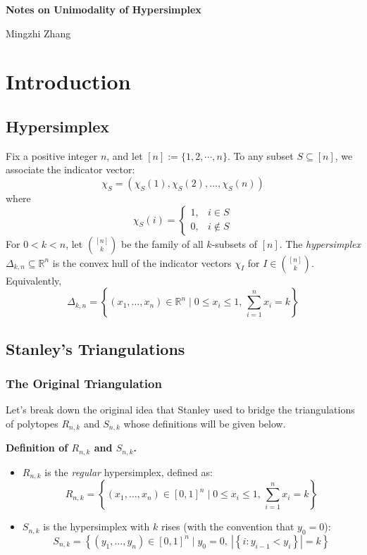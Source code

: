 \documentclass[12pt]{article}
\theoremstyle{definition}
\numberwithin{equation}{subsection}
\begin{document}
\begin{center}
    {\Large\bf Notes on Unimodality of Hypersimplex}
\end{center}
\vskip 3mm
\begin{center}
    Mingzhi Zhang
\end{center}
\vskip 3mm

\section{Introduction}

\subsection{Hypersimplex}
Fix a positive integer $n$, and let $[n]:= \{1, 2, \cdots , n\}$. To any subset $S \subseteq [n]$, we associate the indicator vector:
\[
\chi_{S} = (\chi_{S}(1), \chi_{S}(2), \ldots, \chi_{S}(n))
\]
where 
\[
\chi_{S}(i) = 
\begin{cases} 
1, & i \in S \\
0, & i \notin S
\end{cases}
\]
For $0 < k < n$, let $\binom{[n]}{k}$ be the family of all $k$-subsets of $[n]$. The \textit{hypersimplex} $\Delta_{k,n} \subseteq \mathbb{R}^n$ is the convex hull of the indicator vectors $\chi_I$ for $I \in \binom{[n]}{k}$. Equivalently,
\[
\Delta_{k,n} = \left\{ (x_1, \ldots, x_n) \in \mathbb{R}^n \mid 0 \leq x_i \leq 1,\, \sum_{i=1}^n x_i = k \right\}
\]

\subsection{Stanley's Triangulations}
\subsubsection{The Original Triangulation}
Let's break down the original idea that Stanley used to bridge the triangulations of polytopes $R_{n,k}$ and $S_{n,k}$ whose definitions will be given below.

\textbf{Definition of $R_{n,k}$ and $S_{n,k}$.}
\begin{itemize}
    \item $R_{n,k}$ is the \textit{regular} hypersimplex, defined as:
    \[
    R_{n,k} = \left\{ (x_1, \ldots, x_n) \in [0,1]^n \mid 0 \leq x_i \leq 1,\, \sum_{i=1}^n x_i = k \right\}
    \]
    \item $S_{n,k}$ is the hypersimplex with $k$ rises (with the convention that $y_0 = 0$):
    \[
    S_{n,k} = \left\{ (y_1, \ldots, y_n) \in [0,1]^n \mid y_0 = 0,\ \left|\left\{ i : y_{i-1} < y_i \right\}\right| = k \right\}
    \]
\end{itemize}
\end{document}
